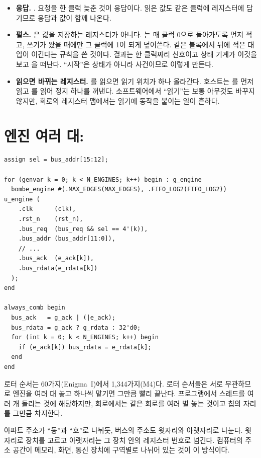 \begin{itemize}
\item \textbf{응답.} . 요청을 한 클럭 늦춘 것이 응답이다. 읽은 값도 같은
클럭에 레지스터에 담기므로 응답과 값이 함께 나온다.
\item \textbf{펄스.} 은 값을 저장하는 레지스터가 아니다. 는 매 클럭 0으로
돌아가도록 먼저 적고, 쓰기가 왔을 때에만 그 클럭에 1이 되게 덮어쓴다. 같은 블록에서 뒤에 적은 대입이
이긴다는 규칙을 쓴 것이다. 결과는 한 클럭짜리 신호이고 상태 기계가 이것을 보고 을 떠난다.
``시작''은 상태가 아니라 사건이므로 이렇게 만든다.
\item \textbf{읽으면 바뀌는 레지스터.} 를 읽으면 읽기 위치가 하나 올라간다. 호스트는
를 먼저 읽고 를 읽어 정지 하나를 꺼낸다. 소프트웨어에서 ``읽기''는 보통
아무것도 바꾸지 않지만, 회로의 레지스터 맵에서는 읽기에 동작을 붙이는 일이 흔하다.
\end{itemize}

\section{엔진 여러 대: \texorpdfstring{}{bombe\_array}}\label{sec:e-array}

\begin{lstlisting}[language=SV,caption={\code{bombe\_array.sv}: 주소의 윗자리로 엔진을 고른다.},label={lst:e-array}]
assign sel = bus_addr[15:12];

for (genvar k = 0; k < N_ENGINES; k++) begin : g_engine
  bombe_engine #(.MAX_EDGES(MAX_EDGES), .FIFO_LOG2(FIFO_LOG2)) u_engine (
    .clk      (clk),
    .rst_n    (rst_n),
    .bus_req  (bus_req && sel == 4'(k)),
    .bus_addr (bus_addr[11:0]),
    // ...
    .bus_ack  (e_ack[k]),
    .bus_rdata(e_rdata[k])
  );
end

always_comb begin
  bus_ack   = g_ack | (|e_ack);
  bus_rdata = g_ack ? g_rdata : 32'd0;
  for (int k = 0; k < N_ENGINES; k++) begin
    if (e_ack[k]) bus_rdata = e_rdata[k];
  end
end
\end{lstlisting}

\Why 로터 순서는 60가지(Enigma~I)에서 1,344가지(M4)다. 로터 순서들은 서로 무관하므로 엔진을 여러 대
놓고 하나씩 맡기면 그만큼 빨리 끝난다. 프로그램에서 스레드를 여러 개 돌리는 것에 해당하지만, 회로에서는
같은 회로를 여러 벌 놓는 것이고 칩의 자리를 그만큼 차지한다.

\General 아파트 주소가 ``동''과 ``호''로 나뉘듯, 버스의 주소도 윗자리와 아랫자리로 나눈다. 윗자리로 장치를
고르고 아랫자리는 그 장치 안의 레지스터 번호로 넘긴다. 컴퓨터의 주소 공간이 메모리, 화면, 통신 장치에
구역별로 나뉘어 있는 것이 이 방식이다.

